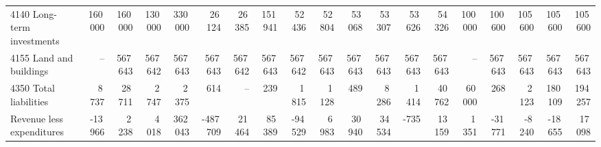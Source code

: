 \begin{tabular}{@{}lrrrrrrrrrrrrrrrrrr@{}}
4140 Long-term investments & 160\,000 & 160\,000 & 130\,000 & 330\,000 & 26\,124 & 26\,385 & 151\,941 & 52\,436 & 52\,804 & 53\,068 & 53\,307 & 53\,626 & 54\,326 & 100\,000 & 100\,600 & 105\,600 & 105\,600 & 105\,600 \\
4155 Land and buildings & -- & 567\,643 & 567\,642 & 567\,643 & 567\,643 & 567\,642 & 567\,643 & 567\,642 & 567\,643 & 567\,643 & 567\,643 & 567\,643 & 567\,643 & -- & 567\,643 & 567\,643 & 567\,643 & 567\,643 \\
4350 Total liabilities & 8\,737 & 28\,711 & 2\,747 & 2\,375 & 614 & -- & 239 & 1\,815 & 1\,128 & 489 & 8\,286 & 1\,414 & 40\,762 & 60\,000 & 268 & 2\,123 & 180\,109 & 194\,257 \\
Revenue less expenditures & -13\,966 & 2\,238 & 4\,018 & 362\,043 & -487\,709 & 21\,464 & 85\,389 & -94\,529 & 6\,983 & 30\,940 & 34\,534 & -735 & 13\,159 & 1\,351 & -31\,771 & -8\,240 & -18\,655 & 17\,098 \\\bottomrule
\end{tabular}
